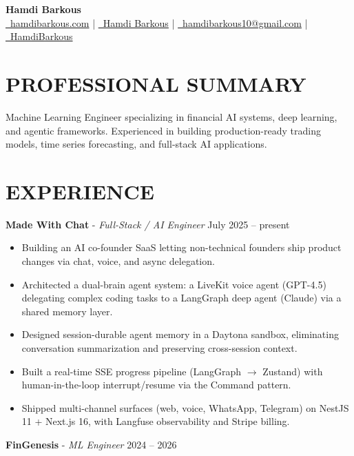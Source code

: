 \documentclass[a4paper,9pt]{extarticle}
\begin{document}
\pagestyle{empty}

\begin{center}
\textbf{\huge Hamdi Barkous}\\[2pt] %
\href{https://hamdibarkous.com}{\faGlobe\ hamdibarkous.com}
 | \href{https://github.com/HamdiBarkous}{\faGithub\ Hamdi Barkous}
 | \href{mailto:hamdibarkous10@gmail.com}{\faEnvelopeO\ hamdibarkous10@gmail.com}
 | \href{https://www.linkedin.com/in/HamdiBarkous}{\faLinkedin\ HamdiBarkous}
\end{center}

\section*{PROFESSIONAL SUMMARY}
Machine Learning Engineer specializing in financial AI systems, deep learning, and agentic frameworks. Experienced in building production-ready trading models, time series forecasting, and full-stack AI applications.

\section*{EXPERIENCE}
\textbf{Made With Chat} - \textit{Full-Stack / AI Engineer} \hfill July 2025 -- present

\begin{itemize}
    \item Building an AI co-founder SaaS letting non-technical founders ship product changes via chat, voice, and async delegation.
    \item Architected a dual-brain agent system: a LiveKit voice agent (GPT-4.5) delegating complex coding tasks to a LangGraph deep agent (Claude) via a shared memory layer.
    \item Designed session-durable agent memory in a Daytona sandbox, eliminating conversation summarization and preserving cross-session context.
    \item Built a real-time SSE progress pipeline (LangGraph $\rightarrow$ Zustand) with human-in-the-loop interrupt/resume via the Command pattern.
    \item Shipped multi-channel surfaces (web, voice, WhatsApp, Telegram) on NestJS 11 + Next.js 16, with Langfuse observability and Stripe billing.
\end{itemize}

\noindent\textbf{FinGenesis} - \textit{ML Engineer} \hfill 2024 -- 2026
\end{document}
